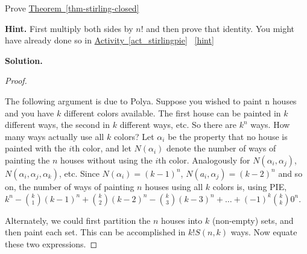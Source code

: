 \documentclass{book}
\begin{document}
\setcounter{project}{285}
\addtocounter{project}{-1}
\begin{activity}[]\label{activity-278}
\hypertarget{p-1458}{}%
Prove \hyperref[thm-stirling-closed]{Theorem~\ref{thm-stirling-closed}}%
\par\smallskip%
\noindent\textbf{Hint.}\hypertarget{hint-187}{}\quad%
\hypertarget{p-1459}{}%
First multiply both sides by \(n!\) and then prove that identity.  You might have already done so in \hyperref[act_stirlingpie]{Activity~\ref{act_stirlingpie}}%
~\hfill{\tiny\hyperlink{a-285}{[hint]}\hypertarget{q-285}{}}\par\smallskip%
\noindent\textbf{Solution.}\hypertarget{solution-188}{}\quad%
\begin{proof}\hypertarget{proof-7}{}
\hypertarget{p-1460}{}%
The following argument is due to Polya. Suppose you wished to paint n houses and you have \(k\) different colors available. The first house can be painted in \(k\) different ways, the second in \(k\) different ways, etc. So there are \(k^{n}\) ways. How many ways actually use all \(k\) colors? Let \(\alpha_{i}\) be the property that no house is painted with the \(i\)th color, and let \(N(\alpha_{i})\) denote the number of ways of painting the \(n\) houses without using the \(i\)th color. Analogously for \(N(\alpha_{i},\alpha_{j})\), \(N(\alpha_{i},\alpha_{j},\alpha_{k})\), etc. Since \(N(\alpha_{i}) = (k - 1)^{n}\), \(N(a_{i},\alpha_{j}) = ( k - 2)^{n}\) and so on, the number of ways of painting \(n\) houses using all \(k\) colors is, using PIE, \(k^{n} -\binom{k}{1} \left(k - 1 \right)^{n} + \binom{k}{2} \left( k - 2 \right)^{n} - \binom{k}{3}      \left( k - 3 \right)^{n} + \ldots + \left( - 1 \right)^{k}\binom{k}{k} 0^{n}\).%
\par
\hypertarget{p-1461}{}%
Alternately, we could first partition the \(n\) houses into \(k\) (non-empty) sets, and then paint each set. This can be    accomplished in \(k!S(n,k)\) ways. Now equate these two expressions.%
\end{proof}
\end{activity}

\clearpage
\end{document}
